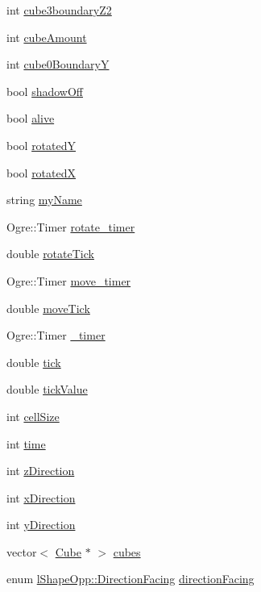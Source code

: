 \begin{DoxyCompactItemize}
\item 
int \hyperlink{classl_shape_opp_ac8f375c93b18c7ecb5271136d7d59b62}{cube3boundary\-Z2}
\item 
int \hyperlink{classl_shape_opp_ab47401e2831e8fbebda5cf1bca10c768}{cube\-Amount}
\item 
int \hyperlink{classl_shape_opp_a4314bc7ac701a665eb73b397b9f883bd}{cube0\-Boundary\-Y}
\item 
bool \hyperlink{classl_shape_opp_a1bfd42ead4f729d742201b8348901508}{shadow\-Off}
\item 
bool \hyperlink{classl_shape_opp_a4ddddfd93dd1c10f0d6681cce2adbf3f}{alive}
\item 
bool \hyperlink{classl_shape_opp_a869749e9b10c2ec5a8f093644a4eda1e}{rotated\-Y}
\item 
bool \hyperlink{classl_shape_opp_a12b818c7fe5f7b1cdbe77f00b36ffb4d}{rotated\-X}
\item 
string \hyperlink{classl_shape_opp_a72072c1bfc3d452ba201926525fc4582}{my\-Name}
\item 
Ogre\-::\-Timer \hyperlink{classl_shape_opp_a80d9cd54854e8af22d8922c99024bbd5}{rotate\-\_\-timer}
\item 
double \hyperlink{classl_shape_opp_aee4e57d432f4f4e19c50e8878f9e87b7}{rotate\-Tick}
\item 
Ogre\-::\-Timer \hyperlink{classl_shape_opp_ac0baad0ea71f63393ecc9311120dd321}{move\-\_\-timer}
\item 
double \hyperlink{classl_shape_opp_a1a6b36a3ca17a596fcec122ce871e320}{move\-Tick}
\item 
Ogre\-::\-Timer \hyperlink{classl_shape_opp_abd9743d641bc2d4d7288a032021bbba3}{\-\_\-timer}
\item 
double \hyperlink{classl_shape_opp_af4608ed51c99004548a9bdf2cae47f9f}{tick}
\item 
double \hyperlink{classl_shape_opp_af3c48655ae6f164e74d29a880c3458a4}{tick\-Value}
\item 
int \hyperlink{classl_shape_opp_a004f76632d9012218835d49fb6e5e7a2}{cell\-Size}
\item 
int \hyperlink{classl_shape_opp_aef174fd2adc27dd52c3dacd62be802ab}{time}
\item 
int \hyperlink{classl_shape_opp_a5ca5f7c8b6b0faf17d04bc2212966c3e}{z\-Direction}
\item 
int \hyperlink{classl_shape_opp_a101294c9ea1dc2f1a37fb95a87426702}{x\-Direction}
\item 
int \hyperlink{classl_shape_opp_a0340df57978d442190a30927a919f34e}{y\-Direction}
\item 
vector$<$ \hyperlink{class_cube}{Cube} $\ast$ $>$ \hyperlink{classl_shape_opp_a4972b990d86d08878ab07ae12b769108}{cubes}
\item 
enum \hyperlink{classl_shape_opp_a6b47570c2f406d7399c38fcf2104a2ec}{l\-Shape\-Opp\-::\-Direction\-Facing} \hyperlink{classl_shape_opp_a03a9b1dc6384306c810468734b299699}{direction\-Facing}
\end{DoxyCompactItemize}



